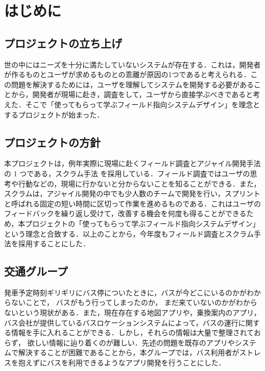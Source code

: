 \chapter{はじめに}

\section{プロジェクトの立ち上げ}
世の中にはニーズを十分に満たしていないシステムが存在する．これは，開発者が作るものとユーザが求めるものとの乖離が原因の1つであると考えられる．この問題を解決するためには，ユーザを理解してシステムを開発する必要があることから，開発者が現場に赴き，調査をして，ユーザから直接学ぶべきであると考えた．そこで「使ってもらって学ぶフィールド指向システムデザイン」を理念とするプロジェクトが始まった．

\section{プロジェクトの方針}
本プロジェクトは，例年実際に現場に赴くフィールド調査とアジャイル開発手法の 1 つである，スクラム手法 \cite{scrum}を採用している．フィールド調査ではユーザの思考や行動などの，現場に行かないと分からないことを知ることができる．また，スクラムは，アジャイル開発の中でも少人数のチームで開発を行い，スプリントと呼ばれる固定の短い時間に区切って作業を進めるものである\cite{scrum}．これはユーザのフィードバックを繰り返し受けて，改善する機会を何度も得ることができるため，本プロジェクトの「使ってもらって学ぶフィールド指向システムデザイン」という理念と合致する．以上のことから，今年度もフィールド調査とスクラム手法を採用することにした．

\section{交通グループ}\label{sec:gaiyou}
発車予定時刻ギリギリにバス停についたときに，バスが今どこにいるのかがわからないことで， バスがもう行ってしまったのか， まだ来ていないのかがわからないという現状がある．また，現在存在する地図アプリや，乗換案内のアプリ，バス会社が提供しているバスロケーションシステム\cite{busLocationSystem}によって，バスの運行に関する情報を手に入れることができる．しかし，それらの情報は大量で整理されておらず， 欲しい情報に辿り着くのが難しい．先述の問題を既存のアプリやシステムで解決することが困難であることから，本グループでは，バス利用者がストレスを抱えずにバスを利用できるようなアプリ開発を行うことにした．
